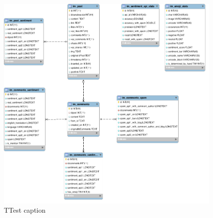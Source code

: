 \begin{figure}[ht]
	\includegraphics[width=1.2\textwidth]{04-framework/01-design/Images/DB_schema.png}
	\caption[Test caption]{TTest caption \label{fig:test-caption}}
\end{figure}